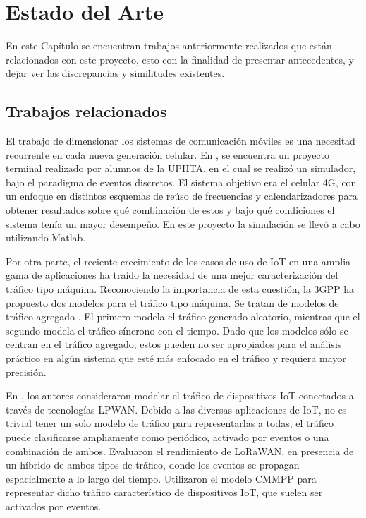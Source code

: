 \chapter{Estado del Arte}
\label{Chapter3} %

En este Capítulo se encuentran trabajos anteriormente realizados que están relacionados con este proyecto, esto con la finalidad de presentar antecedentes, y dejar ver las discrepancias y similitudes existentes.\newline

\section{Trabajos relacionados}

El trabajo de dimensionar los sistemas de comunicación móviles es una necesitad recurrente en cada nueva generación celular. En \parencite{Celis2016}, se encuentra un proyecto terminal realizado por alumnos de la UPIITA, en el cual se realizó un simulador, bajo el paradigma de eventos discretos. El sistema objetivo era el celular 4G, con un enfoque en distintos esquemas de reúso de frecuencias y calendarizadores para obtener resultados sobre qué combinación de estos y bajo qué condiciones el sistema tenía un mayor desempeño. En este proyecto la simulación se llevó a cabo utilizando Matlab.\newline

Por otra parte, el reciente crecimiento de los casos de uso de IoT en una amplia gama de aplicaciones ha traído la necesidad de una mejor caracterización del tráfico tipo máquina. Reconociendo la importancia de esta cuestión, la 3GPP ha propuesto dos modelos para el tráfico tipo máquina. Se tratan de modelos de tráfico agregado . El primero modela el tráfico generado aleatorio, mientras que el segundo modela el tráfico síncrono con el tiempo. Dado que los modelos sólo se centran en el tráfico agregado, estos pueden no ser apropiados para el análisis práctico en algún sistema que esté más enfocado en el tráfico y requiera mayor precisión.\newline

En \parencite{Gupta2018}, los autores consideraron modelar el tráfico de dispositivos IoT conectados a través de tecnologías LPWAN. Debido a las diversas aplicaciones de IoT, no es trivial tener un solo modelo de tráfico para representarlas a todas, el tráfico puede clasificarse ampliamente como periódico, activado por eventos o una combinación de ambos. Evaluaron el rendimiento de LoRaWAN, en presencia de un híbrido de ambos tipos de tráfico, donde los eventos se propagan espacialmente a lo largo del tiempo. Utilizaron el modelo CMMPP para representar dicho tráfico característico de dispositivos IoT, que suelen ser activados por eventos.  \newline

